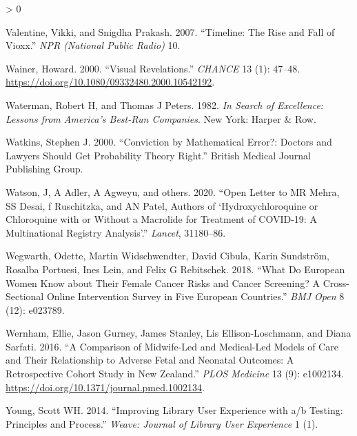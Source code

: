 \documentclass[
  10pt,
  b5paper]{book}
\newlength{\cslhangindent}
\newenvironment{CSLReferences}[2] %
 {%
  \setlength{\parindent}{0pt}
  \ifodd #1 \everypar{\setlength{\hangindent}{\cslhangindent}}\ignorespaces\fi
  \ifnum #2 > 0
  \setlength{\parskip}{#2\baselineskip}
  \fi
 }%
 {}
\begin{document}
\begin{CSLReferences}{1}{0}
\leavevmode\hypertarget{ref-valentine2007timeline}{}%
Valentine, Vikki, and Snigdha Prakash. 2007. {``Timeline: The Rise and Fall of Vioxx.''} \emph{NPR (National Public Radio)} 10.

\leavevmode\hypertarget{ref-wainerRegress}{}%
Wainer, Howard. 2000. {``Visual Revelations.''} \emph{CHANCE} 13 (1): 47--48. \url{https://doi.org/10.1080/09332480.2000.10542192}.

\leavevmode\hypertarget{ref-waterman1982search}{}%
Waterman, Robert H, and Thomas J Peters. 1982. \emph{In Search of Excellence: Lessons from America's Best-Run Companies}. New York: Harper \& Row.

\leavevmode\hypertarget{ref-watkins2000conviction}{}%
Watkins, Stephen J. 2000. {``Conviction by Mathematical Error?: Doctors and Lawyers Should Get Probability Theory Right.''} British Medical Journal Publishing Group.

\leavevmode\hypertarget{ref-watson2020open}{}%
Watson, J, A Adler, A Agweyu, and others. 2020. {``Open Letter to MR Mehra, SS Desai, f Ruschitzka, and AN Patel, Authors of {`Hydroxychloroquine or Chloroquine with or Without a Macrolide for Treatment of COVID-19: A Multinational Registry Analysis'}.''} \emph{Lancet}, 31180--86.

\leavevmode\hypertarget{ref-wegwarth2018european}{}%
Wegwarth, Odette, Martin Widschwendter, David Cibula, Karin Sundström, Rosalba Portuesi, Ines Lein, and Felix G Rebitschek. 2018. {``What Do European Women Know about Their Female Cancer Risks and Cancer Screening? A Cross-Sectional Online Intervention Survey in Five European Countries.''} \emph{BMJ Open} 8 (12): e023789.

\leavevmode\hypertarget{ref-wernham_EtAl_2016}{}%
Wernham, Ellie, Jason Gurney, James Stanley, Lis Ellison-Loschmann, and Diana Sarfati. 2016. {``A Comparison of Midwife-Led and Medical-Led Models of Care and Their Relationship to Adverse Fetal and Neonatal Outcomes: A Retrospective Cohort Study in New Zealand.''} \emph{PLOS Medicine} 13 (9): e1002134. \url{https://doi.org/10.1371/journal.pmed.1002134}.

\leavevmode\hypertarget{ref-young2014improving}{}%
Young, Scott WH. 2014. {``Improving Library User Experience with a/b Testing: Principles and Process.''} \emph{Weave: Journal of Library User Experience} 1 (1).

\end{CSLReferences}

\newpage
\end{document}
